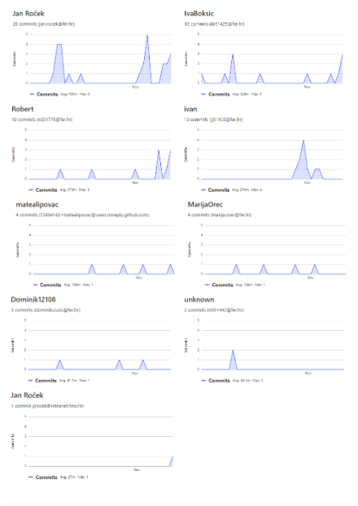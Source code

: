 		\begin{figure}[H]
			\begin{center}
				\includegraphics[width=15cm]{slike/master1.PNG}
				\includegraphics[width=15cm]{slike/master2.PNG}
				\includegraphics[width=15cm]{slike/master3.PNG}
				\includegraphics[width=15cm]{slike/master4.PNG}
				\includegraphics[width=15cm]{slike/master5.PNG}
			\end{center}
			\label{fig:dijapre}
		\end{figure}
	
	